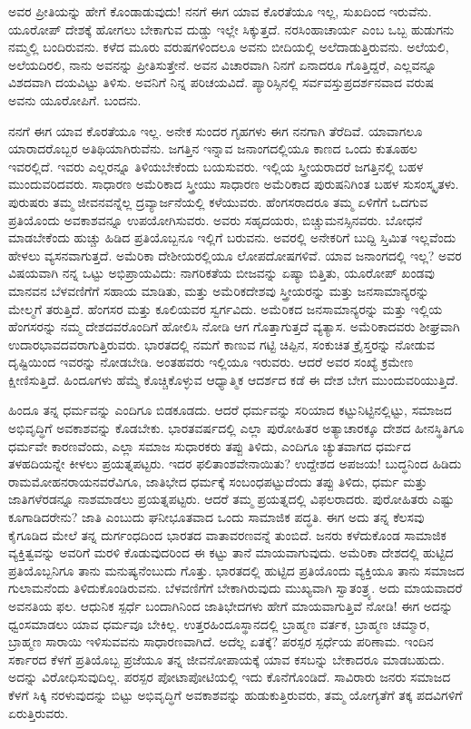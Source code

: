 ಅವರ ಪ್ರೀತಿಯನ್ನು ಹೇಗೆ ಕೊಂಡಾಡುವುದು! ನನಗೆ ಈಗ ಯಾವ ಕೊರತೆಯೂ ಇಲ್ಲ, ಸುಖದಿಂದ ಇರುವೆನು. ಯೂರೋಪ್ ದೇಶಕ್ಕೆ ಹೋಗಲು ಬೇಕಾಗುವ ದುಡ್ಡು ಇಲ್ಲೇ ಸಿಕ್ಕುತ್ತದೆ. ನರಸಿಂಹಾಚಾರ್ಯ ಎಂಬ ಒಬ್ಬ ಹುಡುಗನು ನಮ್ಮಲ್ಲಿ ಬಂದಿರುವನು. ಕಳೆದ ಮೂರು ವರುಷಗಳಿಂದಲೂ ಅವನು ಬೀದಿಯಲ್ಲಿ ಅಲೆದಾಡುತ್ತಿರುವನು. ಅಲೆಯಲಿ, ಅಲೆಯದಿರಲಿ, ನಾನು ಅವನನ್ನು ಪ್ರೀತಿಸುತ್ತೇನೆ. ಅವನ ವಿಚಾರವಾಗಿ ನಿನಗೆ ಏನಾದರೂ ಗೊತ್ತಿದ್ದರೆ, ಎಲ್ಲವನ್ನೂ ವಿಶದವಾಗಿ ದಯವಿಟ್ಟು ತಿಳಿಸು. ಅವನಿಗೆ ನಿನ್ನ ಪರಿಚಯವಿದೆ. ಪ್ಯಾರಿಸ್ಸಿನಲ್ಲಿ ಸರ್ವವಸ್ತುಪ್ರದರ್ಶನವಾದ ವರುಷ ಅವನು ಯೂರೋಪಿಗೆ. ಬಂದನು.

ನನಗೆ ಈಗ ಯಾವ ಕೊರತೆಯೂ ಇಲ್ಲ. ಅನೇಕ ಸುಂದರ ಗೃಹಗಳು ಈಗ ನನಗಾಗಿ ತೆರೆದಿವೆ. ಯಾವಾಗಲೂ ಯಾರಾದರೊಬ್ಬರ ಅತಿಥಿಯಾಗಿರುವೆನು. ಜಗತ್ತಿನ ಇನ್ನಾವ ಜನಾಂಗದಲ್ಲಿಯೂ ಕಾಣದ ಒಂದು ಕುತೂಹಲ ಇವರಲ್ಲಿದೆ. ಇವರು ಎಲ್ಲರನ್ನೂ ತಿಳಿಯಬೇಕೆಂದು ಬಯಸುವರು. ಇಲ್ಲಿಯ ಸ್ತ್ರೀಯರಾದರೆ ಜಗತ್ತಿನಲ್ಲಿ ಬಹಳ ಮುಂದುವರಿದವರು. ಸಾಧಾರಣ ಅಮೆರಿಕಾದ ಸ್ತ್ರೀಯು ಸಾಧಾರಣ ಅಮೆರಿಕಾದ ಪುರುಷನಿಗಿಂತ ಬಹಳ ಸುಸಂಸ್ಕೃತಳು. ಪುರುಷರು ತಮ್ಮ ಜೀವನವನ್ನೆಲ್ಲ ದ್ರವ್ಯಾರ್ಜನೆಯಲ್ಲಿ ಕಳೆಯುವರು. ಹೆಂಗಸರಾದರೂ ತಮ್ಮ ಏಳಿಗೆಗೆ ಒದಗುವ ಪ್ರತಿಯೊಂದು ಅವಕಾಶವನ್ನೂ ಉಪಯೋಗಿಸುವರು. ಅವರು ಸಹೃದಯರು, ಬಿಚ್ಚುಮನಸ್ಸಿನವರು. ಬೋಧನೆ ಮಾಡಬೇಕೆಂದು ಹುಚ್ಚು ಹಿಡಿದ ಪ್ರತಿಯೊಬ್ಬನೂ ಇಲ್ಲಿಗೆ ಬರುವನು. ಅವರಲ್ಲಿ ಅನೇಕರಿಗೆ ಬುದ್ದಿ ಸ್ತಿಮಿತ ಇಲ್ಲವೆಂದು ಹೇಳಲು ವ್ಯಸನವಾಗುತ್ತದೆ. ಅಮೆರಿಕಾ ದೇಶೀಯರಲ್ಲಿಯೂ ಲೋಪದೋಷಗಳಿವೆ. ಯಾವ ಜನಾಂಗದಲ್ಲಿ ಇಲ್ಲ? ಅವರ ವಿಷಯವಾಗಿ ನನ್ನ ಒಟ್ಟು ಅಭಿಪ್ರಾಯವಿದು: ನಾಗರಿಕತೆಯ ಬೀಜವನ್ನು ಏಷ್ಯಾ ಬಿತ್ತಿತು, ಯೂರೋಪ್ ಖಂಡವು ಮಾನವನ ಬೆಳವಣಿಗೆಗೆ ಸಹಾಯ ಮಾಡಿತು, ಮತ್ತು ಅಮೆರಿಕದೇಶವು ಸ್ತ್ರೀಯರನ್ನು ಮತ್ತು ಜನಸಾಮಾನ್ಯರನ್ನು ಮೇಲ್ಮಗೆ ತರುತ್ತಿದೆ. ಹೆಂಗಸರ ಮತ್ತು ಕೂಲಿಯವರ ಸ್ವರ್ಗವಿದು. ಅಮೆರಿಕದ ಜನಸಾಮಾನ್ಯರನ್ನು ಮತ್ತು ಇಲ್ಲಿಯ ಹೆಂಗಸರನ್ನು ನಮ್ಮ ದೇಶದವರೊಂದಿಗೆ ಹೋಲಿಸಿ ನೋಡಿ ಆಗ ಗೊತ್ತಾಗುತ್ತದೆ ವ್ಯತ್ಯಾಸ. ಅಮೆರಿಕಾದವರು ಶೀಘ್ರವಾಗಿ ಉದಾರಭಾವದವರಾಗುತ್ತಿರುವರು. ಭಾರತದಲ್ಲಿ ನಮಗೆ ಕಾಣುವ ಗಟ್ಟಿ ಚಿಪ್ಪಿನ, ಸಂಕುಚಿತ ಕ್ರೈಸ್ತರನ್ನು ನೋಡುವ ದೃಷ್ಟಿಯಿಂದ ಇವರನ್ನು ನೋಡಬೇಡಿ. ಅಂತಹವರು ಇಲ್ಲಿಯೂ ಇರುವರು. ಆದರೆ ಅವರ ಸಂಖ್ಯೆ ಕ್ರಮೇಣ ಕ್ಷೀಣಿಸುತ್ತಿದೆ. ಹಿಂದೂಗಳು ಹೆಮ್ಮೆ ಕೊಚ್ಚಿಕೊಳ್ಳುವ ಆಧ್ಯಾತ್ಮಿಕ ಆದರ್ಶದ ಕಡೆ ಈ ದೇಶ ಬೇಗ ಮುಂದುವರಿಯುತ್ತಿದೆ.

ಹಿಂದೂ ತನ್ನ ಧರ್ಮವನ್ನು ಎಂದಿಗೂ ಬಿಡಕೂಡದು. ಆದರೆ ಧರ್ಮವನ್ನು ಸರಿಯಾದ ಕಟ್ಟುನಿಟ್ಟಿನಲ್ಲಿಟ್ಟು, ಸಮಾಜದ ಅಭಿವೃದ್ಧಿಗೆ ಅವಕಾಶವನ್ನು ಕೊಡಬೇಕು. ಭಾರತವರ್ಷದಲ್ಲಿ ಎಲ್ಲಾ ಪುರೋಹಿತರ ಅತ್ಯಾಚಾರಕ್ಕೂ ದೇಶದ ಹೀನಸ್ಥಿತಿಗೂ ಧರ್ಮವೇ ಕಾರಣವೆಂದು, ಎಲ್ಲಾ ಸಮಾಜ ಸುಧಾರಕರು ತಪ್ಪು ತಿಳಿದು, ಎಂದಿಗೂ ಚ್ಯುತವಾಗದ ಧರ್ಮದ ತಳಹದಿಯನ್ನೇ ಕೀಳಲು ಪ್ರಯತ್ನಪಟ್ಟರು. ಇದರ ಫಲಿತಾಂಶವೇನಾಯಿತು? ಉದ್ದೇಶದ ಅಪಜಯ! ಬುದ್ಧನಿಂದ ಹಿಡಿದು ರಾಮಮೋಹನರಾಯನವರೆವಿಗೂ, ಜಾತಿಭೇದ ಧರ್ಮಕ್ಕೆ ಸಂಬಂಧಪಟ್ಟುದೆಂದು ತಪ್ಪು ತಿಳಿದು, ಧರ್ಮ ಮತ್ತು ಜಾತಿಗಳೆರಡನ್ನೂ ನಾಶಮಾಡಲು ಪ್ರಯತ್ನಪಟ್ಟರು. ಆದರೆ ತಮ್ಮ ಪ್ರಯತ್ನದಲ್ಲಿ ವಿಫಲರಾದರು. ಪುರೋಹಿತರು ಎಷ್ಟು ಕೂಗಾಡಿದರೇನು? ಜಾತಿ ಎಂಬುದು ಘನೀಭೂತವಾದ ಒಂದು ಸಾಮಾಜಿಕ ಪದ್ಧತಿ. ಈಗ ಅದು ತನ್ನ ಕೆಲಸವು ಕೈಗೂಡಿದ ಮೇಲೆ ತನ್ನ ದುರ್ಗಂಧದಿಂದ ಭಾರತದ ವಾತಾವರಣವನ್ನೆ ತುಂಬಿದೆ. ಜನರು ಕಳೆದುಕೊಂಡ ಸಾಮಾಜಿಕ ವ್ಯಕ್ತಿತ್ವವನ್ನು ಅವರಿಗೆ ಮರಳಿ ಕೊಡುವುದರಿಂದ ಈ ಕಟ್ಟು ತಾನೆ ಮಾಯವಾಗುವುದು. ಅಮೆರಿಕಾ ದೇಶದಲ್ಲಿ ಹುಟ್ಟಿದ ಪ್ರತಿಯೊಬ್ಬನಿಗೂ ತಾನು ಮನುಷ್ಯನೆಂಬುದು ಗೊತ್ತು. ಭಾರತದಲ್ಲಿ ಹುಟ್ಟಿದ ಪ್ರತಿಯೊಂದು ವ್ಯಕ್ತಿಯೂ ತಾನು ಸಮಾಜದ ಗುಲಾಮನೆಂದು ತಿಳಿದುಕೊಂಡಿರುವನು. ಬೆಳವಣಿಗೆಗೆ ಬೇಕಾಗಿರುವುದು ಮುಖ್ಯವಾಗಿ ಸ್ವಾತಂತ್ರ್ಯ. ಅದು ಮಾಯವಾದರೆ ಅವನತಿಯ ಫಲ. ಆಧುನಿಕ ಸ್ಪರ್ಧೆ ಬಂದಾಗಿನಿಂದ ಜಾತಿಭೇದಗಳು ಹೇಗೆ ಮಾಯವಾಗುತ್ತಿವೆ ನೋಡಿ! ಈಗ ಅದನ್ನು ಧ್ವಂಸಮಾಡಲು ಯಾವ ಧರ್ಮವೂ ಬೇಕಿಲ್ಲ. ಉತ್ತರಹಿಂದೂಸ್ಥಾನದಲ್ಲಿ ಬ್ರಾಹ್ಮಣ ವರ್ತಕ, ಬ್ರಾಹ್ಮಣ ಚಮ್ಮಾರ, ಬ್ರಾಹ್ಮಣ ಸಾರಾಯಿ ಇಳಿಸುವವನು ಸಾಧಾರಣವಾಗಿದೆ. ಅದೆಲ್ಲ ಏತಕ್ಕೆ? ಪರಸ್ಪರ ಸ್ಪರ್ಧೆಯ ಪರಿಣಾಮ. ಇಂದಿನ ಸರ್ಕಾರದ ಕೆಳಗೆ ಪ್ರತಿಯೊಬ್ಬ ಪ್ರಜೆಯೂ ತನ್ನ ಜೀವನೋಪಾಯಕ್ಕೆ ಯಾವ ಕಸಬನ್ನು ಬೇಕಾದರೂ ಮಾಡಬಹುದು. ಅದನ್ನು ವಿರೋಧಿಸುವುದಿಲ್ಲ. ಪರಸ್ಪರ ಪೋಟಾಪೋಟಿಯಲ್ಲಿ ಇದು ಕೊನೆಗೊಂಡಿದೆ. ಸಾವಿರಾರು ಜನರು ಸಮಾಜದ ಕೆಳಗೆ ಸಿಕ್ಕಿ ನರಳುವುದನ್ನು ಬಿಟ್ಟು ಅಭಿವೃದ್ಧಿಗೆ ಅವಕಾಶವನ್ನು ಹುಡುಕುತ್ತಿರುವರು, ತಮ್ಮ ಯೋಗ್ಯತೆಗೆ ತಕ್ಕ ಪದವಿಗಳಿಗೆ ಏರುತ್ತಿರುವರು.

